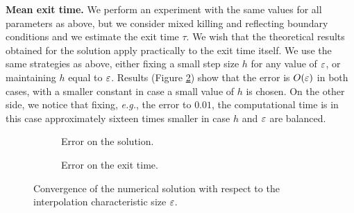 \vspace{2mm}
\noindent \textbf{Mean exit time.} We perform an experiment with the same values for all parameters as above, but we consider mixed killing and reflecting boundary conditions and we estimate the exit time $\tau$. We wish that the theoretical results obtained for the solution apply practically to the exit time itself. We use the same strategies as above, either fixing a small step size $h$ for any value of $\varepsilon$, or maintaining $h$ equal to $\varepsilon$. Results (Figure \ref{fig:TheoryTau}) show that the error is $O(\varepsilon)$ in both cases, with a smaller constant in case a small value of $h$ is chosen. On the other side, we notice that fixing, \textit{e.g.}, the error to $0.01$, the computational time is in this case approximately sixteen times smaller in case $h$ and $\varepsilon$ are balanced.

\begin{figure}[t]
    \centering
    \begin{subfigure}{0.49\linewidth}
        \centering
        \resizebox{1\linewidth}{!}{ }   
        \caption{Error on the solution.}
        \label{fig:TheoryX}
    \end{subfigure}
    \begin{subfigure}{0.49\linewidth}
        \centering
        \resizebox{1\linewidth}{!}{ }  
        \caption{Error on the exit time.}
        \label{fig:TheoryTau}
    \end{subfigure}    
    \caption{Convergence of the numerical solution with respect to the interpolation characteristic size $\varepsilon$.}
    \label{fig:Theory}
\end{figure}
